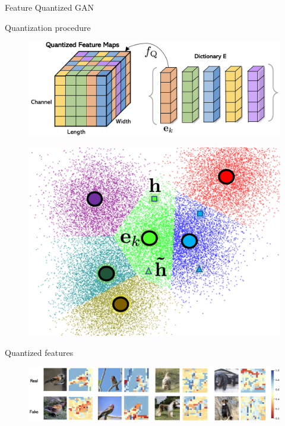 \begin{frame}{Feature Quantized GAN}
	\begin{block}{Quantization procedure}
		\begin{minipage}[t]{0.65\columnwidth}
			\begin{figure}
				\centering
				\includegraphics[width=\linewidth]{figs/fqgan_cnn.png}
			\end{figure}
		\end{minipage}%
		\begin{minipage}[t]{0.35\columnwidth}
			\begin{figure}
				\centering
				\includegraphics[width=0.9\linewidth]{figs/fqgan_lookup}
			\end{figure}
		\end{minipage}
	\end{block}
	\begin{block}{Quantized features}
		\begin{figure}
			\centering
			\includegraphics[width=\linewidth]{figs/fqgan_features}
		\end{figure}
	\end{block}
\end{frame}

